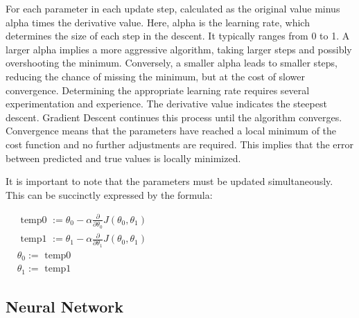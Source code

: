 \documentclass{article}
\begin{document}
    For each parameter in each update step, calculated as the original value minus alpha times the derivative value. Here, alpha is the learning rate, which determines the size of each step in the descent. It typically ranges from 0 to 1. A larger alpha implies a more aggressive algorithm, taking larger steps and possibly overshooting the minimum. Conversely, a smaller alpha leads to smaller steps, reducing the chance of missing the minimum, but at the cost of slower convergence. Determining the appropriate learning rate requires several experimentation and experience. The derivative value indicates the steepest descent. Gradient Descent continues this process until the algorithm converges. Convergence means that the parameters have reached a local minimum of the cost function and no further adjustments are required. This implies that the error between predicted and true values is locally minimized.

    It is important to note that the parameters must be updated simultaneously. This can be succinctly expressed by the formula:

     \hspace*{\fill}

     $\begin{aligned} & \text { temp0 }:=\theta_0-\alpha \frac{\partial}{\partial \theta_0} J\left(\theta_0, \theta_1\right) \\ & \text { temp1 }:=\theta_1-\alpha \frac{\partial}{\partial \theta_1} J\left(\theta_0, \theta_1\right) \\ & \theta_0:=\text { temp0 } \\ & \theta_1:=\text { temp1 }\end{aligned}$

     \hspace*{\fill}


     \newpage
	\subsection{Neural Network}
\end{document}
